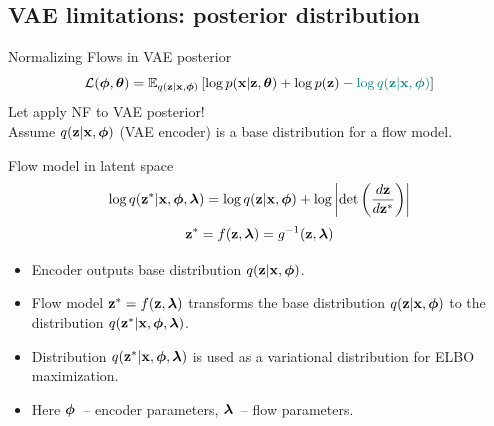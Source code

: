 \documentclass{beamer}
\begin{document}
\subsection{VAE limitations: posterior distribution}
\begin{frame}{Normalizing Flows in VAE posterior}
		\vspace{-0.3cm}
		\[
			\mathcal{L}(\boldsymbol{\phi}, \boldsymbol{\theta}) = \mathbb{E}_{q(\mathbf{z} | \mathbf{x}, \boldsymbol{\phi})} \left[ \log p(\mathbf{x} | \mathbf{z}, \boldsymbol{\theta}) + \log p(\mathbf{z}) - {\color{teal}\log q(\mathbf{z} | \mathbf{x}, \boldsymbol{\phi})} \right]
		\]
	Let apply NF to VAE posterior! \\ 
	Assume $q(\mathbf{z} | \mathbf{x}, \boldsymbol{\phi})$ (VAE encoder) is a base distribution for a flow model.
	\begin{block}{Flow model in latent space}
		\vspace{-0.5cm}
		\[
		\log q(\mathbf{z}^* | \mathbf{x}, \boldsymbol{\phi}, \boldsymbol{\lambda}) = \log q(\mathbf{z} | \mathbf{x}, \boldsymbol{\phi}) + \log \left | \det \left( \frac{d \mathbf{z}}{d \mathbf{z}^*}\right) \right|
		\]
		\vspace{-0.3cm}
		\[
		\mathbf{z}^* = f(\mathbf{z}, \boldsymbol{\lambda}) = g^{-1}(\mathbf{z}, \boldsymbol{\lambda})
		\]
		\vspace{-0.7cm}
	\end{block}
	\begin{itemize}
		\item Encoder outputs base distribution $q(\mathbf{z} | \mathbf{x}, \boldsymbol{\phi})$.
		\item Flow model $\mathbf{z}^* = f(\mathbf{z}, \boldsymbol{\lambda})$ transforms the base distribution $q(\mathbf{z} | \mathbf{x}, \boldsymbol{\phi})$ to the distribution $q(\mathbf{z}^* | \mathbf{x}, \boldsymbol{\phi}, \boldsymbol{\lambda})$.
		\item Distribution $q(\mathbf{z}^* | \mathbf{x}, \boldsymbol{\phi}, \boldsymbol{\lambda})$ is used as a variational distribution for ELBO maximization. 
		\item Here $\boldsymbol{\phi}$~-- encoder parameters, $\boldsymbol{\lambda}$~-- flow parameters.
	\end{itemize}
\end{frame}
\end{document}
